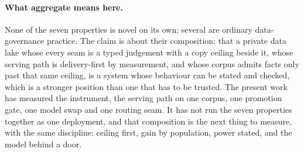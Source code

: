 \documentclass[10pt,twocolumn]{article}
\begin{document}
\paragraph{What aggregate means here.} None of the seven properties is novel on its own; several are ordinary data-governance practice. The claim is about their composition: that a private data lake whose every seam is a typed judgement with a copy ceiling beside it, whose serving path is delivery-first by measurement, and whose corpus admits facts only past that same ceiling, is a system whose behaviour can be stated and checked, which is a stronger position than one that has to be trusted. The present work has measured the instrument, the serving path on one corpus, one promotion gate, one model swap and one routing seam. It has not run the seven properties together as one deployment, and that composition is the next thing to measure, with the same discipline: ceiling first, gain by population, power stated, and the model behind a door.
\end{document}
